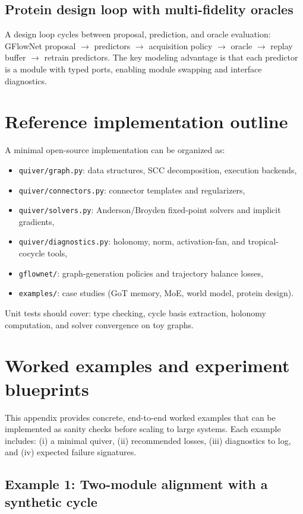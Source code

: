 \documentclass[11pt]{article}
\theoremstyle{definition}
\theoremstyle{plain}
\theoremstyle{remark}
\begin{document}
\subsection{Protein design loop with multi-fidelity oracles}
A design loop cycles between proposal, prediction, and oracle evaluation:
GFlowNet proposal $\to$ predictors $\to$ acquisition policy $\to$ oracle $\to$ replay buffer $\to$ retrain predictors.
The key modeling advantage is that each predictor is a module with typed ports, enabling module swapping and interface diagnostics.

\section{Reference implementation outline}
\label{app:refimpl}

A minimal open-source implementation can be organized as:
\begin{itemize}[leftmargin=2em]
\item \texttt{quiver/graph.py}: data structures, SCC decomposition, execution backends,
\item \texttt{quiver/connectors.py}: connector templates and regularizers,
\item \texttt{quiver/solvers.py}: Anderson/Broyden fixed-point solvers and implicit gradients,
\item \texttt{quiver/diagnostics.py}: holonomy, norm, activation-fan, and tropical-cocycle tools,
\item \texttt{gflownet/}: graph-generation policies and trajectory balance losses,
\item \texttt{examples/}: case studies (GoT memory, MoE, world model, protein design).
\end{itemize}
Unit tests should cover: type checking, cycle basis extraction, holonomy computation, and solver convergence on toy graphs.



\section{Worked examples and experiment blueprints}
\label{app:worked}

This appendix provides concrete, end-to-end worked examples that can be implemented as sanity checks before scaling to large systems.
Each example includes: (i) a minimal quiver, (ii) recommended losses, (iii) diagnostics to log, and (iv) expected failure signatures.

\subsection{Example 1: Two-module alignment with a synthetic cycle}
\end{document}
